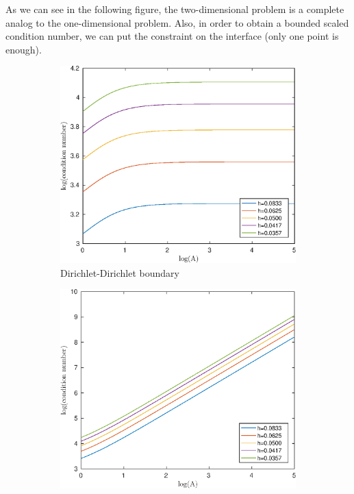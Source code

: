\documentclass[12pt]{article}
\begin{document}
As we can see in the following figure, the two-dimensional problem is a complete analog to the one-dimensional problem. Also, in order to obtain a bounded scaled condition number, we can put the constraint on the interface (only one point is enough).
\pagebreak
\begin{figure}[h!]
\centering
\begin{subfigure}{0.4\textwidth}
\includegraphics[width=\textwidth]{cond-A-2D-linear-DD}
\caption{Dirichlet-Dirichlet boundary}
\end{subfigure}
\hfill
\begin{subfigure}{0.4\textwidth}
\includegraphics[width=\textwidth]{cond-A-2D-linear-DN}

\end{subfigure}
\end{figure}
\end{document}
